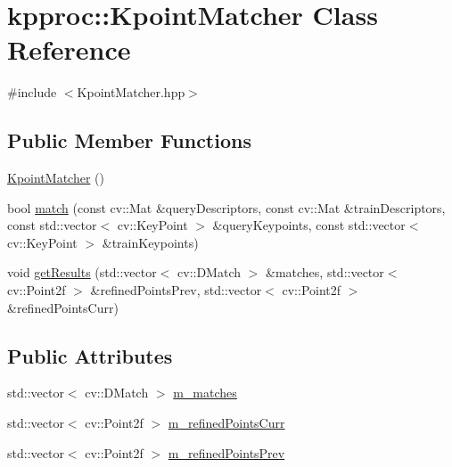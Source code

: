 \hypertarget{classkpproc_1_1KpointMatcher}{}\section{kpproc\+:\+:Kpoint\+Matcher Class Reference}
\label{classkpproc_1_1KpointMatcher}


{\ttfamily \#include $<$Kpoint\+Matcher.\+hpp$>$}

\subsection*{Public Member Functions}
\begin{DoxyCompactItemize}
\item 
\hyperlink{classkpproc_1_1KpointMatcher_a4a40c73477a60c38e5f12ed6f204ab9a}{Kpoint\+Matcher} ()
\item 
bool \hyperlink{classkpproc_1_1KpointMatcher_a21caea2a00576784b2fc90dd652870ed}{match} (const cv\+::\+Mat \&query\+Descriptors, const cv\+::\+Mat \&train\+Descriptors, const std\+::vector$<$ cv\+::\+Key\+Point $>$ \&query\+Keypoints, const std\+::vector$<$ cv\+::\+Key\+Point $>$ \&train\+Keypoints)
\item 
void \hyperlink{classkpproc_1_1KpointMatcher_a02f6944a8401a2a14bb5ce42073389b0}{get\+Results} (std\+::vector$<$ cv\+::\+D\+Match $>$ \&matches, std\+::vector$<$ cv\+::\+Point2f $>$ \&refined\+Points\+Prev, std\+::vector$<$ cv\+::\+Point2f $>$ \&refined\+Points\+Curr)
\end{DoxyCompactItemize}
\subsection*{Public Attributes}
\begin{DoxyCompactItemize}
\item 
std\+::vector$<$ cv\+::\+D\+Match $>$ \hyperlink{classkpproc_1_1KpointMatcher_a082b2988b8e0381f2286dcaa1725a8db}{m\+\_\+matches}
\item 
std\+::vector$<$ cv\+::\+Point2f $>$ \hyperlink{classkpproc_1_1KpointMatcher_a9a0c678dccf356d72b2a69542bcfe960}{m\+\_\+refined\+Points\+Curr}
\item 
std\+::vector$<$ cv\+::\+Point2f $>$ \hyperlink{classkpproc_1_1KpointMatcher_ad21af067c2a5fa339aba9abe85fa943a}{m\+\_\+refined\+Points\+Prev}
\end{DoxyCompactItemize}
